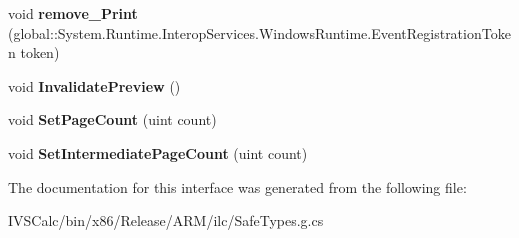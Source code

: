 \begin{DoxyCompactItemize}
\item 
\mbox{\label{interface_microsoft_1_1_graphics_1_1_canvas_1_1_printing_1_1_i_canvas_print_document_a6c6e9590103da951592e47820ae53fdb}} 
void {\bfseries remove\+\_\+\+Print} (global\+::\+System.\+Runtime.\+Interop\+Services.\+Windows\+Runtime.\+Event\+Registration\+Token token)
\item 
\mbox{\label{interface_microsoft_1_1_graphics_1_1_canvas_1_1_printing_1_1_i_canvas_print_document_a6624a11a39bdacc1332f7370fe4e289a}} 
void {\bfseries Invalidate\+Preview} ()
\item 
\mbox{\label{interface_microsoft_1_1_graphics_1_1_canvas_1_1_printing_1_1_i_canvas_print_document_a27ce0b5fa1108240d85779236c1ab571}} 
void {\bfseries Set\+Page\+Count} (uint count)
\item 
\mbox{\label{interface_microsoft_1_1_graphics_1_1_canvas_1_1_printing_1_1_i_canvas_print_document_a7f760cb71cc746fd247a12e55ba416a1}} 
void {\bfseries Set\+Intermediate\+Page\+Count} (uint count)
\end{DoxyCompactItemize}


The documentation for this interface was generated from the following file\+:\begin{DoxyCompactItemize}
\item 
I\+V\+S\+Calc/bin/x86/\+Release/\+A\+R\+M/ilc/Safe\+Types.\+g.\+cs\end{DoxyCompactItemize}

